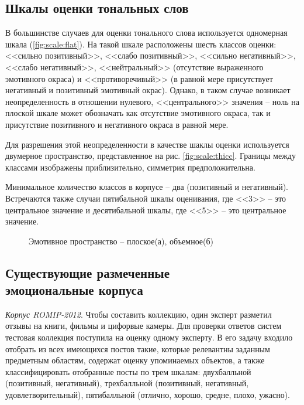 \subsection{Шкалы оценки тональных слов}
В большинстве случаев для оценки тонального слова используется одномерная шкала (\ref{fig:scale:flat}).  
На такой шкале расположены шесть классов оценки: <<сильно позитивный>>, <<слабо позитивный>>, <<сильно негативный>>, <<слабо негативный>>, <<нейтральный>> (отсутствие выраженного эмотивного окраса) и <<противоречивый>> (в равной мере присутствует негативный и позитивный эмотивный окрас). Однако,  в таком случае возникает неопределенность в отношении нулевого, <<центрального>> значения -- ноль на плоской шкале может обозначать как отсутствие эмотивного окраса, так и присутствие позитивного и негативного окраса в равной мере.

Для разрешения этой неопределенности в качестве шаклы оценки используется двумерное пространство, представленное на рис. \ref{fig:scale:thicc}.  Границы между классами изображены приблизительно, симметрия предположительна.

Минимальное количество классов в корпусе -- два (позитивный и негативный). \cite{КотельниковЕ.2021} Встречаются также случаи пятибальной шкалы оценивания, где <<3>> -- это центральное значение и десятибальной шкалы, где <<5>> -- это центральное значение.

\begin{figure}[H]
	\centering
	
	 \newline
	\caption{Эмотивное пространство -- плоское(а), объемное(б)}
\end{figure}

\subsection[Существующие размеченные эмоциональные корпуса]{Существующие размеченные\\эмоциональные корпуса}
\textit{Корпус ROMIP-2012}. \cite{Chetviorkin2012} Чтобы составить коллекцию, один эксперт разметил отзывы на книги, фильмы и цифорвые камеры. Для проверки ответов систем тестовая коллекция поступила на оценку одному эксперту.  В его задачу входило отобрать из всех имеющихся постов  такие, которые релевантны заданным предметным областям, содержат оценку упоминаемых объектов, а также классифицировать отобранные посты по трем шкалам: двухбалльной (позитивный, негативный), трехбалльной (позитивный, негативный, удовлетворительный), пятибалльной (отлично, хорошо, средне, плохо, ужасно).

